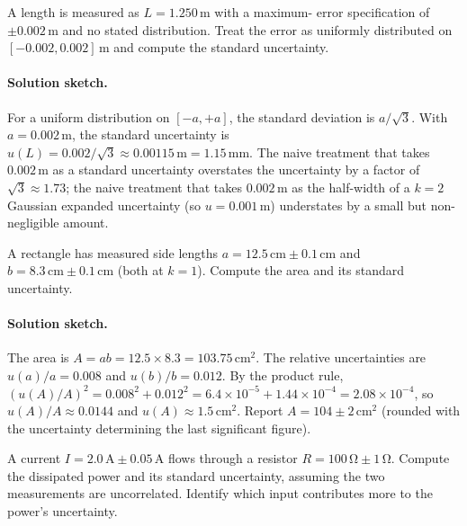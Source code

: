 \begin{exercise}
A length is measured as $L = 1.250 \,\si{\meter}$ with a maximum-
error specification of $\pm 0.002 \,\si{\meter}$ and no stated
distribution. Treat the error as uniformly distributed on
$[-0.002, 0.002] \,\si{\meter}$ and compute the standard uncertainty.
\end{exercise}

\paragraph{Solution sketch.}
For a uniform distribution on $[-a, +a]$, the standard deviation is
$a/\sqrt{3}$. With $a = 0.002 \,\si{\meter}$, the standard
uncertainty is $u(L) = 0.002/\sqrt{3} \approx 0.00115 \,\si{\meter}
= 1.15 \,\si{\milli\meter}$. The naive treatment that takes
$0.002 \,\si{\meter}$ as a standard uncertainty overstates the
uncertainty by a factor of $\sqrt{3} \approx 1.73$; the naive
treatment that takes $0.002 \,\si{\meter}$ as the half-width of a
$k = 2$ Gaussian expanded uncertainty (so $u = 0.001 \,\si{\meter}$)
understates by a small but non-negligible amount.

\begin{exercise}
A rectangle has measured side lengths $a = 12.5 \,\si{\centi\meter}
\pm 0.1 \,\si{\centi\meter}$ and $b = 8.3 \,\si{\centi\meter} \pm
0.1 \,\si{\centi\meter}$ (both at $k = 1$). Compute the area and
its standard uncertainty.
\end{exercise}

\paragraph{Solution sketch.}
The area is $A = ab = 12.5 \times 8.3 = 103.75 \,\si{\centi\meter
\squared}$. The relative uncertainties are $u(a)/a = 0.008$ and
$u(b)/b = 0.012$. By the product rule, $(u(A)/A)^{2} =
0.008^{2} + 0.012^{2} = 6.4 \times 10^{-5} + 1.44 \times 10^{-4}
= 2.08 \times 10^{-4}$, so $u(A)/A \approx 0.0144$ and $u(A)
\approx 1.5 \,\si{\centi\meter\squared}$. Report
$A = 104 \pm 2 \,\si{\centi\meter\squared}$ (rounded with the
uncertainty determining the last significant figure).

\begin{exercise}
A current $I = 2.0 \,\si{\ampere} \pm 0.05 \,\si{\ampere}$ flows
through a resistor $R = 100 \,\si{\ohm} \pm 1 \,\si{\ohm}$. Compute
the dissipated power and its standard uncertainty, assuming the
two measurements are uncorrelated. Identify which input contributes
more to the power's uncertainty.
\end{exercise}

